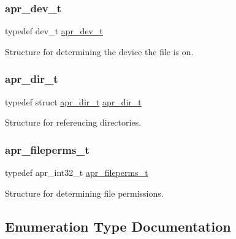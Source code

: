 \subsubsection{\texorpdfstring{apr\+\_\+dev\+\_\+t}{apr\_dev\_t}}
{\footnotesize\ttfamily typedef dev\+\_\+t \mbox{\hyperlink{group__apr__file__info_gae2c25c4b679613081599f776efa96c4a}{apr\+\_\+dev\+\_\+t}}}

Structure for determining the device the file is on. \mbox{\label{group__apr__file__info_ga92ed8cf52cba2abb42cf74087aa74da8}} 
\subsubsection{\texorpdfstring{apr\+\_\+dir\+\_\+t}{apr\_dir\_t}}
{\footnotesize\ttfamily typedef struct \mbox{\hyperlink{structapr__dir__t}{apr\+\_\+dir\+\_\+t}} \mbox{\hyperlink{structapr__dir__t}{apr\+\_\+dir\+\_\+t}}}

Structure for referencing directories. \mbox{\label{group__apr__file__info_ga3af19c4c47007169064a70f9351bc7d8}} 
\subsubsection{\texorpdfstring{apr\+\_\+fileperms\+\_\+t}{apr\_fileperms\_t}}
{\footnotesize\ttfamily typedef apr\+\_\+int32\+\_\+t \mbox{\hyperlink{group__apr__file__info_ga3af19c4c47007169064a70f9351bc7d8}{apr\+\_\+fileperms\+\_\+t}}}

Structure for determining file permissions. 

\subsection{Enumeration Type Documentation}
\mbox{\label{group__apr__file__info_gae3f0ce3014337a52b39852f8bf81ca7c}} 
